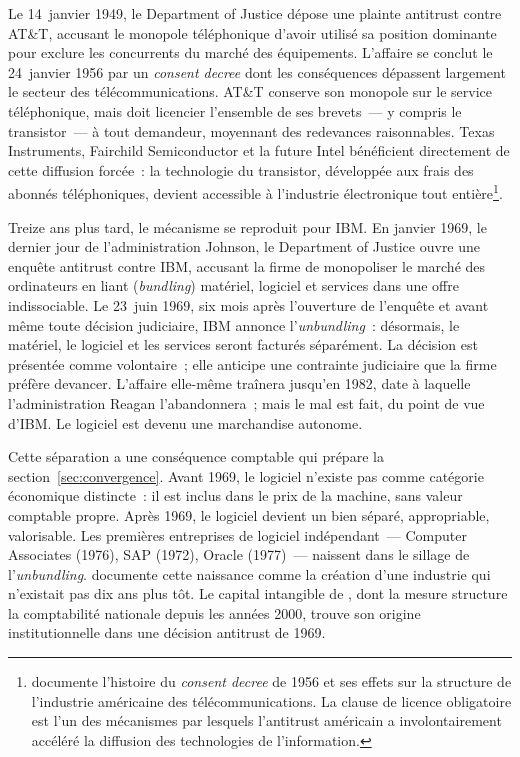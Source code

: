 %
Le 14~janvier 1949, le Department of Justice dépose une plainte antitrust contre AT\&T, accusant le monopole téléphonique d'avoir utilisé sa position dominante pour exclure les concurrents du marché des équipements. L'affaire se conclut le 24~janvier 1956 par un \emph{consent decree} dont les conséquences dépassent largement le secteur des télécommunications. AT\&T conserve son monopole sur le service téléphonique, mais doit licencier l'ensemble de ses brevets~--- y compris le transistor~--- à tout demandeur, moyennant des redevances raisonnables. Texas Instruments, Fairchild Semiconductor et la future Intel bénéficient directement de cette diffusion forcée~: la technologie du transistor, développée aux frais des abonnés téléphoniques, devient accessible à l'industrie électronique tout entière\footnote{\textcite{temin_fall_1987} documente l'histoire du \emph{consent decree} de 1956 et ses effets sur la structure de l'industrie américaine des télécommunications. La clause de licence obligatoire est l'un des mécanismes par lesquels l'antitrust américain a involontairement accéléré la diffusion des technologies de l'information.}.

%
Treize ans plus tard, le mécanisme se reproduit pour IBM. En janvier 1969, le dernier jour de l'administration Johnson, le Department of Justice ouvre une enquête antitrust contre IBM, accusant la firme de monopoliser le marché des ordinateurs en liant (\emph{bundling}) matériel, logiciel et services dans une offre indissociable. Le 23~juin 1969, six mois après l'ouverture de l'enquête et avant même toute décision judiciaire, IBM annonce l'\emph{unbundling}~: désormais, le matériel, le logiciel et les services seront facturés séparément. La décision est présentée comme volontaire~; elle anticipe une contrainte judiciaire que la firme préfère devancer. L'affaire elle-même traînera jusqu'en 1982, date à laquelle l'administration Reagan l'abandonnera~; mais le mal est fait, du point de vue d'IBM. Le logiciel est devenu une marchandise autonome.

%
Cette séparation a une conséquence comptable qui prépare la section~\ref{sec:convergence}. Avant 1969, le logiciel n'existe pas comme catégorie économique distincte~: il est inclus dans le prix de la machine, sans valeur comptable propre. Après 1969, le logiciel devient un bien séparé, appropriable, valorisable. Les premières entreprises de logiciel indépendant~--- Computer Associates (1976), SAP (1972), Oracle (1977)~--- naissent dans le sillage de l'\emph{unbundling}. \textcite{campbell-kelly_software_2003} documente cette naissance comme la création d'une industrie qui n'existait pas dix ans plus tôt. Le capital intangible de \textcite{corrado_intangible_2005}, dont la mesure structure la comptabilité nationale depuis les années 2000, trouve son origine institutionnelle dans une décision antitrust de 1969.

